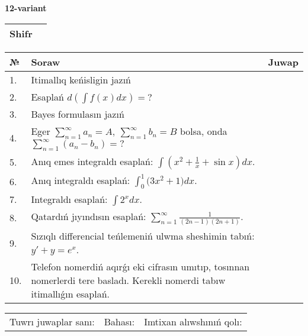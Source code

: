\documentclass{article}
\begin{document}
  \egroup
  
  \newpage
  
  
  \textbf{12-variant}\\
  
  \bgroup
  \def\arraystretch{1.6} %
  
  \begin{tabular}{|m{5.7cm}|m{9.5cm}|}
  \hline
  Shifr & \\
  \hline
  \end{tabular}
  
  \vspace{1cm}
  
  \begin{tabular}{|m{0.7cm}|m{10cm}|m{4cm}|}
  \hline
  № & Soraw & Juwap \\
  \hline
  1. & Itimallıq keńisligin jazıń &  \\
  \hline
  2. & Esaplań \(d\left( \int{f(x)dx} \right) = ?\) &  \\
  \hline
  3. & Bayes formulasın jazıń &  \\
  \hline
  4. & Eger \(\sum_{n = 1}^{\infty}a_{n} = A,\ \sum_{n = 1}^{\infty}b_{n} = B\) bolsa, onda \(\sum_{n = 1}^{\infty}\left( a_{n} - b_{n} \right) = ?\) &  \\
  \hline
  5. & Anıq emes integraldı esaplań: \(\int{\left( x^2  + \frac{1}{x} + \sin x \right)dx}\). &  \\
  \hline
  6. & Anıq integraldı esaplań: \(\int_{0}^{1}{(3x^2 } + 1)dx\). &  \\
  \hline
  7. & Integraldı esaplań: \(\int{2^{x}dx}\). &  \\
  \hline
  8. & Qatardıń jıyındısın esaplań: \(\sum_{n = 1}^{\infty}\frac{1}{(2n - 1)(2n + 1)}\). &  \\
  \hline
  9. & Sızıqlı differencial teńlemeniń ulwma sheshimin tabıń: \(y' + y = e^{x}\). &  \\
  \hline
  10. & Telefon nomerdiń aqırǵı eki cifrasın umıtıp, tosınnan nomerlerdi tere basladı. Kerekli nomerdi tabıw itimallıǵın esaplań. &  \\
  \hline
  \end{tabular}
  
  \vspace{1cm}
  
  \begin{tabular}{lll}
  Tuwrı juwaplar sanı: \underline{\hspace{1.5cm}} & 
  Bahası: \underline{\hspace{1.5cm}} & 
  Imtixan alıwshınıń qolı: \underline{\hspace{2cm}} \\
  \end{tabular}
  
\end{document}
